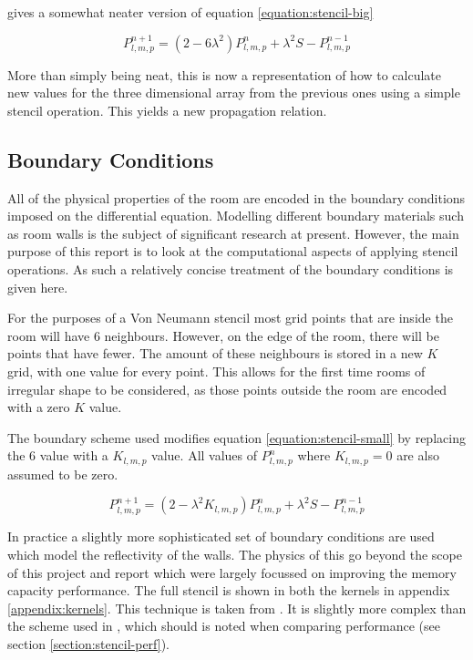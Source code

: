 \documentclass[12pt,a4paper]{report}
\begin{document}
gives a somewhat neater version of equation \ref{equation:stencil-big}

\begin{equation}
\label{equation:stencil-small}
P_{l,m,p}^{n+1} = (2 - 6 \lambda^2)P_{l,m,p}^{n} + \lambda^2 S - P_{l,m,p}^{n-1}
\end{equation}

More than simply being neat, this is now a representation of how to calculate new values for the three dimensional array from the previous ones using a simple stencil operation. This yields a new propagation relation.



\subsection{Boundary Conditions}

All of the physical properties of the room are encoded in the boundary conditions imposed on the differential equation. Modelling different boundary materials such as room walls is the subject of significant research at present. However, the main purpose of this report is to look at the computational aspects of applying stencil operations. As such a relatively concise treatment of the boundary conditions is given here.

For the purposes of a Von Neumann stencil most grid points that are inside the room will have 6 neighbours. However, on the edge of the room, there will be points that have fewer. The amount of these neighbours is stored in a new $K$ grid, with one value for every point. This allows for the first time rooms of irregular shape to be considered, as those points outside the room are encoded with a zero $K$ value.

The boundary scheme used modifies equation \ref{equation:stencil-small} by replacing the \num{6} value with a $K_{l,m,p}$ value. All values of $P_{l,m,p}^{n}$ where $K_{l,m,p} = 0$ are also assumed to be zero.

\begin{equation}
\label{equation:stencil-boundary}
P_{l,m,p}^{n+1} = (2 - \lambda^2 K_{l,m,p} )P_{l,m,p}^{n} + \lambda^2 S - P_{l,m,p}^{n-1}
\end{equation}

In practice a slightly more sophisticated set of boundary conditions are used which model the reflectivity of the walls. The physics of this go beyond the scope of this project and report which were largely focussed on improving the memory capacity performance. The full stencil is shown in both the kernels in appendix \ref{appendix:kernels}. This technique is taken from \cite{brian}. It is slightly more complex than the scheme used in \cite{craig}, which should is noted when comparing performance (see section \ref{section:stencil-perf}).
\end{document}
